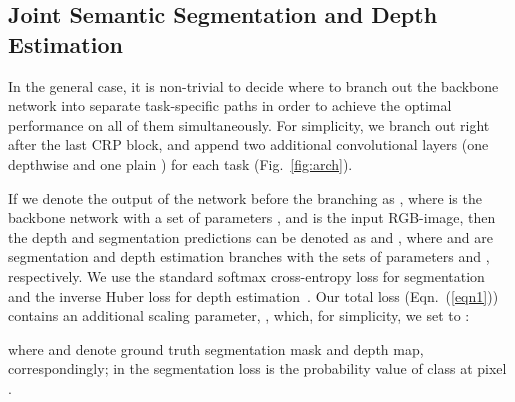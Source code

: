 \documentclass[letterpaper, 10 pt, conference]{ieeeconf}
\begin{document}
\subsection{Joint Semantic Segmentation and Depth Estimation}
In the general case, it is non-trivial to decide where to branch out the backbone network into separate task-specific paths in order to achieve the optimal performance on all of them simultaneously. For simplicity, we branch out right after the last CRP block, and append two additional convolutional layers (one depthwise  and one plain ) for each task (Fig.~\ref{fig:arch}).

If we denote the output of the network before the branching as , where  is the backbone network with a set of parameters , and  is the input RGB-image, then the depth and segmentation predictions can be denoted as  and , where  and  are segmentation and depth estimation branches with the sets of parameters  and , respectively. We use the standard softmax cross-entropy loss for segmentation and the inverse Huber loss for depth estimation~\cite{Laina2016}. Our total loss (Eqn.~(\ref{eqn1})) contains an additional scaling parameter, , which, for simplicity, we set to :


\setlength{\arraycolsep}{0.0em}

where  and  denote ground truth segmentation mask and depth map, correspondingly;  in the segmentation loss is the probability value of class  at pixel .
\end{document}
